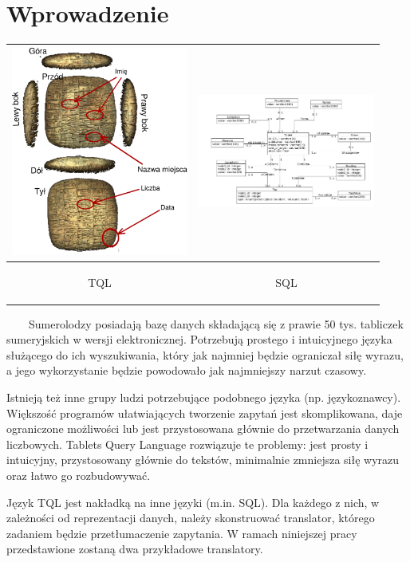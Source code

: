 \chapter*{Wprowadzenie}
\begin{tabular}{|c|c|}
\hline
 \includegraphics[width=220px]{./diagramy/tabliczka.pdf}
 & 
 \includegraphics[width=220px]{./diagramy/diagram-encji-maly.pdf}\\
\hline
\begin{Huge}TQL\end{Huge} & \begin{Huge}SQL\end{Huge} \\
\hline 
\end{tabular} 



\ \ \ \ Sumerolodzy posiadają bazę danych składającą się z prawie 50 tys. tabliczek sumeryjskich w wersji elektronicznej. Potrzebują prostego i intuicyjnego języka służącego do ich wyszukiwania, który jak najmniej będzie ograniczał siłę wyrazu, a jego wykorzystanie będzie powodowało jak najmniejszy narzut czasowy.

  Istnieją też inne grupy ludzi potrzebujące podobnego języka (np. językoznawcy). Większość programów ułatwiających tworzenie zapytań jest skomplikowana, daje ograniczone możliwości lub jest przystosowana głównie do przetwarzania danych liczbowych. Tablets Query Language rozwiązuje te problemy: jest prosty i intuicyjny, przystosowany głównie do tekstów, minimalnie zmniejsza siłę wyrazu oraz łatwo go rozbudowywać. 

  Język TQL jest nakładką na inne języki (m.in. SQL). Dla każdego z nich, w zależności od reprezentacji danych, należy skonstruować translator, którego zadaniem będzie przetłumaczenie zapytania. W ramach niniejszej pracy przedstawione zostaną dwa przykładowe translatory.

